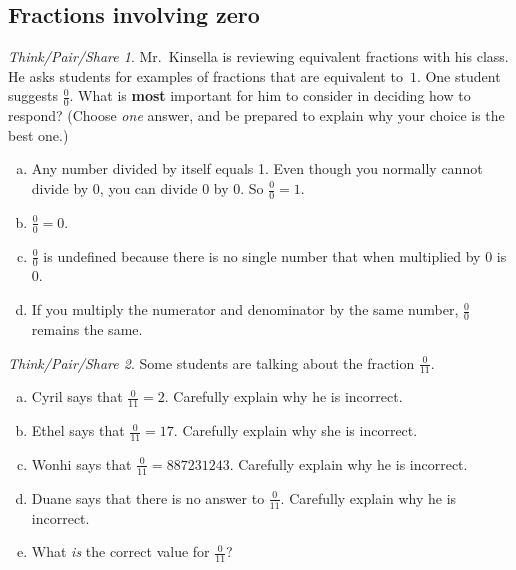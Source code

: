 \documentclass[10pt, reqno]{amsart}
\theoremstyle{remark}
\newtheorem*{thinkpair*}{Think/Pair/Share}
\theoremstyle{definition}
\numberwithin{equation}{section}  %
\begin{document}
\subsection{Fractions involving zero}

\begin{thinkpair*}
Mr.~Kinsella is reviewing equivalent fractions with his class.  He asks students for examples of fractions that are equivalent to~$1$.  One student suggests $\frac{0}{0}$.  What is {\bf most} important for him to consider in deciding how to respond?  (Choose \emph{one} answer, and be prepared to explain why your choice is the best one.)

\begin{enumerate}[(a)]
\item
Any number divided by itself equals 1.  Even though you normally cannot divide by 0, you can divide 0 by 0.  So $\frac 0 0 = 1$.\\

\item
$\frac 0 0 = 0 $.\\

\item
$\frac 0 0 $ is undefined because there is no single number that when multiplied by 0 is 0.\\

\item
If you multiply the numerator and denominator by the same number, $\frac 0 0 $ remains the same.

\end{enumerate}

\end{thinkpair*}



\begin{thinkpair*}
Some students are talking about the fraction $\frac 0{11}$.
\begin{enumerate}[(a)]
\item
Cyril says that $\frac 0{11} = 2$.  Carefully explain why he is incorrect.\\

\item
Ethel says that $\frac 0{11} = 17$.  Carefully explain why she is incorrect.\\

\item
Wonhi says that $\frac 0{11} = 887231243$.  Carefully explain why he is incorrect.\\

\item
Duane says that there is no answer to $\frac 0{11}$.  Carefully explain why he is incorrect.\\

\item
What \emph{is} the correct value for $\frac 0{11}$?
\end{enumerate}
\end{thinkpair*}
\end{document}
